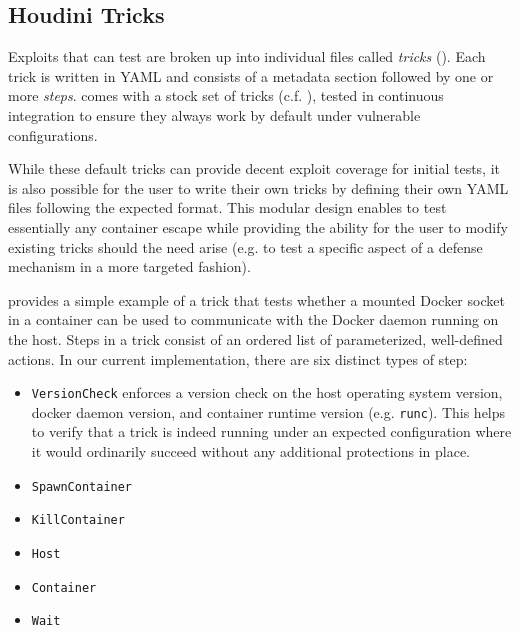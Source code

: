 
\subsection{Houdini Tricks}

Exploits that \houdini can test are broken up into individual files called
\textit{tricks} (). Each \houdini trick is written in YAML and consists of a metadata section
followed by one or more \textit{steps}. \houdini comes with a stock set of tricks (c.f\@.
), tested in continuous integration to ensure they always
work by default under vulnerable configurations.

While these default tricks can provide decent exploit coverage for initial tests, it is
also possible for the user to write their own tricks by defining their own YAML files
following the expected format. This modular design enables \houdini to test essentially
any container escape while providing the ability for the user to modify existing tricks
should the need arise (e.g\@. to test a specific aspect of a defense mechanism in a more
targeted fashion).

 provides a simple example of a \houdini trick that tests
whether a mounted Docker socket in a container can be used to communicate with the Docker
daemon running on the host. Steps in a \houdini trick consist of an ordered list of
parameterized, well-defined actions. In our current implementation, there are six distinct
types of step:

\begin{itemize}
  \item \texttt{VersionCheck} enforces a version check on the host operating system version,
  docker daemon version, and container runtime version (e.g\@. \texttt{runc}). This helps
  to verify that a trick is indeed running under an expected configuration where it
  would ordinarily succeed without any additional protections in place.

  \item \texttt{SpawnContainer}

  \item \texttt{KillContainer}

  \item \texttt{Host}

  \item \texttt{Container}

  \item \texttt{Wait}
\end{itemize}


